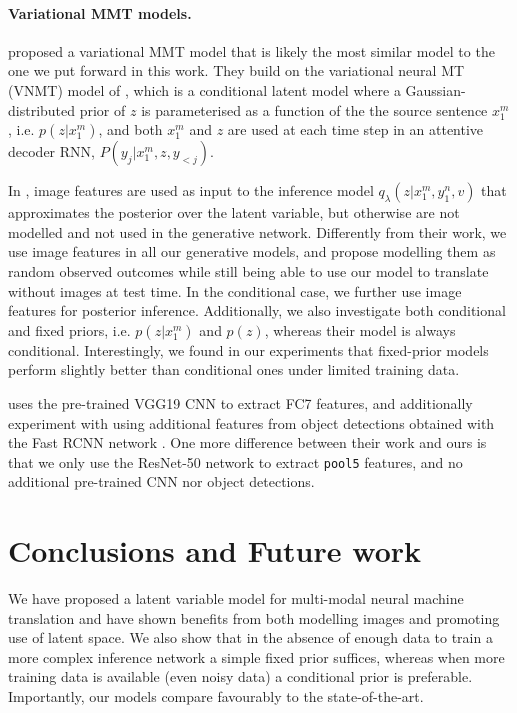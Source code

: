 \documentclass[11pt,a4paper]{article}
\begin{document}
\paragraph{Variational MMT models.} \citet{Toyamaetal2016} proposed a variational MMT model that is likely the most similar model to the one we put forward in this work.
They build on the variational neural MT (VNMT) model of \citet{Zhangetal2016}, which is a conditional latent model where a Gaussian-distributed prior of $z$ is parameterised as a function of the the source sentence $x_1^m$, i.e. $p(z|x_1^m)$, and both $x_1^m$ and $z$ are used at each time step in an attentive decoder RNN, $P(y_j|x_1^m, z, y_{<j})$.

In \citet{Toyamaetal2016}, image features are used as input to the inference model $q_\lambda(z|x_1^m, y_1^n, v)$ that approximates the posterior over the latent variable, but otherwise are not modelled and not used in the generative network.
Differently from their work, we use image features in all our generative models, and propose modelling them as random observed outcomes while still being able to use our model to translate without images at test time.
In the conditional case, we further use image features for posterior inference. 
Additionally, we also investigate both conditional and fixed priors, i.e. $p(z|x_1^m)$ and $p(z)$, whereas their model is always conditional.
Interestingly, we found in our experiments that fixed-prior models perform slightly better than conditional ones under limited training data.

\citet{Toyamaetal2016} uses the pre-trained VGG19 CNN \citep{SimonyanZisserman2014} to extract FC7 features, and additionally experiment with using additional features from object detections obtained with the Fast RCNN network \citep{Girshick2015}.
One more difference between their work and ours is that we only use the ResNet-50 network to extract \texttt{pool5} features, and no additional pre-trained CNN nor object detections.
 
\section{Conclusions and Future work}\label{sec:conclusions}

We have proposed a latent variable model for multi-modal neural machine translation and have shown benefits from both modelling images and promoting use of latent space.
We also show that in the absence of enough data to train a more complex inference network a simple fixed prior suffices, whereas when more training data is available (even noisy data) a conditional prior is preferable. 
Importantly, our models compare favourably to the state-of-the-art.
\end{document}
